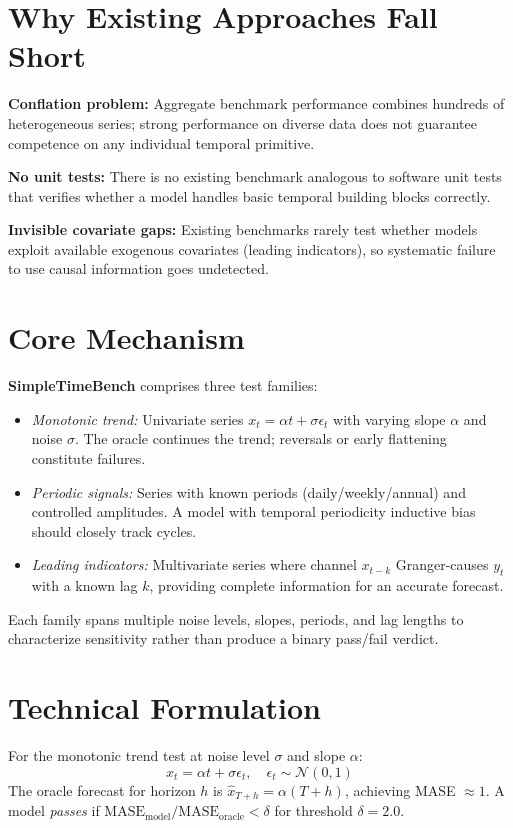 \documentclass[10pt,twocolumn]{article}
\begin{document}
\section{Why Existing Approaches Fall Short}

\textbf{Conflation problem:} Aggregate benchmark performance combines hundreds of
heterogeneous series; strong performance on diverse data does not guarantee competence
on any individual temporal primitive.

\textbf{No unit tests:} There is no existing benchmark analogous to software unit tests
that verifies whether a model handles basic temporal building blocks correctly.

\textbf{Invisible covariate gaps:} Existing benchmarks rarely test whether models
exploit available exogenous covariates (leading indicators), so systematic failure
to use causal information goes undetected.

\section{Core Mechanism}

\textbf{SimpleTimeBench} comprises three test families:
\begin{itemize}[itemsep=2pt,parsep=0pt]
  \item \emph{Monotonic trend:} Univariate series $x_t = \alpha t + \sigma\epsilon_t$
    with varying slope $\alpha$ and noise $\sigma$. The oracle continues the trend;
    reversals or early flattening constitute failures.
  \item \emph{Periodic signals:} Series with known periods (daily/weekly/annual)
    and controlled amplitudes. A model with temporal periodicity inductive bias
    should closely track cycles.
  \item \emph{Leading indicators:} Multivariate series where channel $x_{t-k}$
    Granger-causes $y_t$ with a known lag $k$, providing complete information
    for an accurate forecast.
\end{itemize}

Each family spans multiple noise levels, slopes, periods, and lag lengths to
characterize sensitivity rather than produce a binary pass/fail verdict.

\section{Technical Formulation}

For the monotonic trend test at noise level $\sigma$ and slope $\alpha$:
\[
x_t = \alpha t + \sigma \epsilon_t, \quad \epsilon_t \sim \mathcal{N}(0,1)
\]
The oracle forecast for horizon $h$ is $\hat{x}_{T+h} = \alpha(T+h)$, achieving MASE $\approx 1$.
A model \emph{passes} if $\text{MASE}_{\text{model}} / \text{MASE}_{\text{oracle}} < \delta$
for threshold $\delta = 2.0$.
\end{document}
